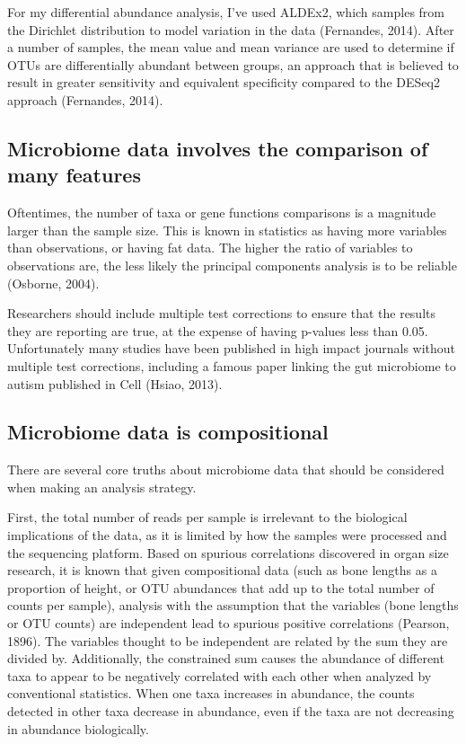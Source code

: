 For my differential abundance analysis, I’ve used ALDEx2, which samples from the Dirichlet distribution to model variation in the data (Fernandes, 2014). After a number of samples, the mean value and mean variance are used to determine if OTUs are differentially abundant between groups, an approach that is believed to result in greater sensitivity and equivalent specificity compared to the DESeq2 approach (Fernandes, 2014).

\subsection{Microbiome data involves the comparison of many features}
Oftentimes, the number of taxa or gene functions comparisons is a magnitude larger than the sample size. This is known in statistics as having more variables than observations, or having fat data. The higher the ratio of variables to observations are, the less likely the principal components analysis is to be reliable (Osborne, 2004).

Researchers should include multiple test corrections to ensure that the results they are reporting are true, at the expense of having p-values less than 0.05. Unfortunately many studies have been published in high impact journals without multiple test corrections, including a famous paper linking the gut microbiome to autism published in Cell (Hsiao, 2013).

\subsection{Microbiome data is compositional}
There are several core truths about microbiome data that should be considered when making an analysis strategy.

First, the total number of reads per sample is irrelevant to the biological implications of the data, as it is limited by how the samples were processed and the sequencing platform. Based on spurious correlations discovered in organ size research, it is known that given compositional data (such as bone lengths as a proportion of height, or OTU abundances that add up to the total number of counts per sample), analysis with the assumption that the variables (bone lengths or OTU counts) are independent lead to spurious positive correlations (Pearson, 1896). The variables thought to be independent are related by the sum they are divided by. Additionally, the constrained sum causes the abundance of different taxa to appear to be negatively correlated with each other when analyzed by conventional statistics. When one taxa increases in abundance, the counts detected in other taxa decrease in abundance, even if the taxa are not decreasing in abundance biologically.

